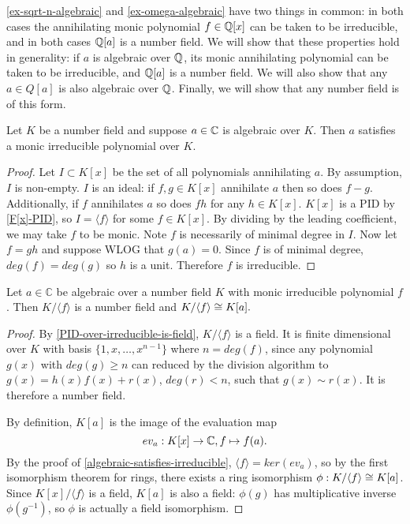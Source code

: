 \cref{ex-sqrt-n-algebraic} and \cref{ex-omega-algebraic} have two things in common: in both cases the annihilating monic polynomial $f\in \mathbb{Q}[x]$ can be taken to be irreducible, and in both cases $\mathbb{Q}[a]$ is a number field. We will show that these properties hold in generality: if $a$ is algebraic over $\mathbb{Q}$, its monic annihilating polynomial can be taken to be irreducible, and $\mathbb{Q}[a]$ is a number field. We will also show that any $a\in Q[a]$ is also algebraic over $\mathbb{Q}$. Finally, we will show that any number field is of this form.

\begin{lemma}\label{algebraic-satisfies-irreducible}
Let $K$ be a number field and suppose $a\in \mathbb{C}$ is algebraic over $K$. Then $a$ satisfies a monic irreducible polynomial over $K$.
\end{lemma}
\begin{proof}
Let $I\subset K[x]$ be the set of all polynomials annihilating $a$. By assumption, $I$ is non-empty. $I$ is an ideal: if $f,g\in K[x]$ annihilate $a$ then so does $f-g$. Additionally, if $f$ annihilates $a$ so does $fh$ for any $h\in K[x]$. $K[x]$ is a PID by \cref{F[x]-PID}, so $I=\langle f\rangle$ for some $f\in K[x]$. By dividing by the leading coefficient, we may take $f$ to be monic. Note $f$ is necessarily of minimal degree in $I$. Now let $f=gh$ and suppose WLOG that $g(a)=0$. Since $f$ is of minimal degree, $deg(f)=deg(g)$ so $h$ is a unit. Therefore $f$ is irreducible.  \end{proof}


\begin{lemma}\label{algebraic-gives-field}
Let $a\in \mathbb{C}$ be algebraic over a number field $K$ with monic irreducible polynomial $f$. Then $K/\langle f\rangle$ is a number field and $K/\langle f \rangle \cong K[a].$
\end{lemma}
\begin{proof}
By \cref{PID-over-irreducible-is-field}, $K/\langle f\rangle$ is a field. It is finite dimensional over $K$ with basis $\{1,x,\dots,x^{n-1}\}$ where $n=deg(f)$, since any polynomial $g(x)$ with $deg(g)\geq n$ can reduced by the division algorithm to $g(x)=h(x)f(x)+r(x)$, $deg(r)<n$, such that $g(x)\sim r(x)$. It is therefore a number field.

By definition, $K[a]$ is the image of the evaluation map $$ev_a:K[x]\rightarrow \mathbb{C}, f\mapsto f(a).$$ By the proof of \cref{algebraic-satisfies-irreducible}, $\langle f \rangle =ker(ev_a)$, so by the first isomorphism theorem for rings, there exists a ring isomorphism $\phi:K/\langle f \rangle \cong K[a]$. Since $K[x]/\langle f\rangle$ is a field, $K[a]$ is also a field: $\phi(g)$ has multiplicative inverse $\phi(g^{-1})$, so $\phi$ is actually a field isomorphism.
\end{proof}

